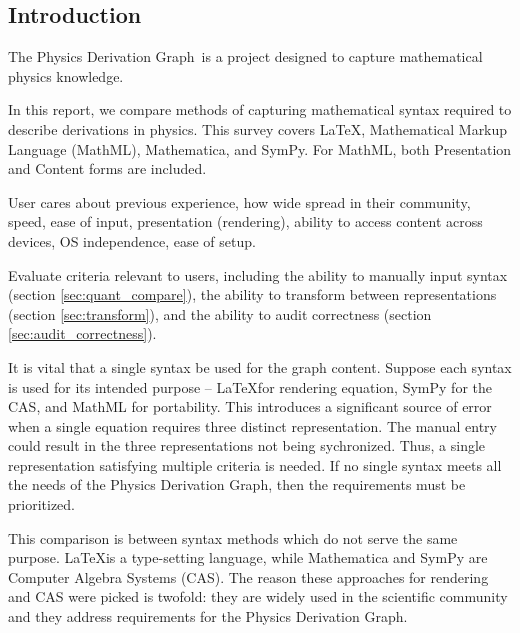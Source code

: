 \documentclass{article}
\newcommand{\pdg}{Physics Derivation Graph}
\begin{document}
\begin{multicols}{2}





\section{Introduction}

The \pdg\ is a project designed to capture mathematical physics knowledge. 


In this report, we compare methods of capturing mathematical syntax required to describe derivations in physics. This survey covers \LaTeX, Mathematical Markup Language (MathML)\cite{2014_MathML}, Mathematica\cite{2014_mathematica}, and SymPy\cite{2014_SymPy}. For MathML, both Presentation and Content forms are included.

User cares about previous experience, how wide spread in their community, speed, ease of input, presentation (rendering), ability to access content across devices, OS independence, ease of setup. 

Evaluate criteria relevant to users, including the ability to manually input syntax (section \ref{sec:quant_compare}), the ability to transform between representations (section \ref{sec:transform}), and the ability to audit correctness (section \ref{sec:audit_correctness}).

It is vital that a single syntax be used for the graph content. Suppose each syntax is used for its intended purpose -- \LaTeX for rendering equation, SymPy for the CAS, and MathML for portability. This introduces a significant source of error when a single equation requires three distinct representation. The manual entry could result in the three representations not being sychronized. Thus, a single representation satisfying multiple criteria is needed. If no single syntax meets all the needs of the Physics Derivation Graph, then the requirements must be prioritized.

This comparison is between syntax methods which do not serve the same purpose. \LaTeX is a type-setting language, while Mathematica and SymPy are Computer Algebra Systems (CAS). The reason these approaches for rendering and CAS were picked is twofold: they are widely used in the scientific community and they address requirements for the Physics Derivation Graph. 


\end{multicols}
\end{document}

